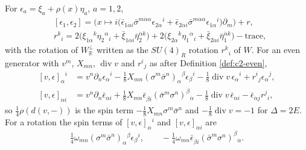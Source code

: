 \begin{remark}
For $\epsilon_a=\xi_a+\rho(x)\eta_a$, $a=1,2$,
\[
\begin{aligned}
&[\epsilon_1,\epsilon_2]=\Big(x\mapsto i\big(\bar\epsilon_{1\dot\alpha i}\bar\sigma^{m\dot\alpha\alpha}\epsilon_{2\alpha}{}^i+\bar\epsilon_{2\dot\alpha i}\bar\sigma^{m\dot\alpha\alpha}\epsilon_{1\alpha}{}^i\big)\partial_m\Big)+r,\\
&r^k{}_i=2\big(\xi_{1\alpha}{}^k\eta_2{}^\alpha{}_i+\bar\xi_{1\dot\alpha i}\bar\eta_2^{\dot\alpha k}\big)+2\big(\xi_{2\alpha}{}^k\eta_1{}^\alpha{}_i+\bar\xi_{2\dot\alpha i}\bar\eta_1^{\dot\alpha k}\big)-\mathrm{trace},
\end{aligned}
\]
with the rotation of $W_{\mathbb R}^\perp$ written as the $SU(4)_R$ rotation $r^k{}_i$ of $W$. For an even generator with $v^m$, $X_{mn}$, $\operatorname{div}v$ and $r^i{}_j$ as after Definition \ref{def:c2-even},
\[
\begin{aligned}
[v,\epsilon]_\alpha{}^i&=v^n\partial_n\epsilon_\alpha{}^i-\tfrac18X_{mn}(\sigma^m\bar\sigma^n)_\alpha{}^\beta\epsilon_\beta{}^i-\tfrac18\operatorname{div}v\,\epsilon_\alpha{}^i+r^i{}_j\epsilon_\alpha{}^j,\\
[v,\epsilon]_{\dot\alpha i}&=v^n\partial_n\bar\epsilon_{\dot\alpha i}+\tfrac18X_{mn}\bar\epsilon_{\dot\beta i}(\bar\sigma^m\sigma^n)^{\dot\beta}{}_{\dot\alpha}-\tfrac18\operatorname{div}v\,\bar\epsilon_{\dot\alpha i}-\bar\epsilon_{\dot\alpha j}r^j{}_i ,
\end{aligned}
\]
so $\tfrac14\rho(d(v,-))$ is the spin term $-\tfrac18X_{mn}\sigma^m\bar\sigma^n$ and $-\tfrac18\operatorname{div}v=-1$ for $\Delta=2E$. For a rotation the spin terms of $[v,\epsilon]_\alpha{}^i$ and $[v,\epsilon]_{\dot\alpha i}$ are
\[
\tfrac14\omega_{mn}(\sigma^m\bar\sigma^n)_\alpha{}^\beta\epsilon_\beta{}^i,\qquad -\tfrac14\omega_{mn}\bar\epsilon_{\dot\beta i}(\bar\sigma^m\sigma^n)^{\dot\beta}{}_{\dot\alpha}.
\]
\end{remark}

